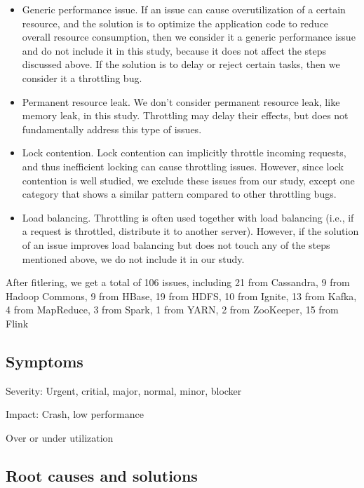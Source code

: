 \begin{itemize}

\item Generic performance issue. If an issue can cause overutilization of a certain resource, and the solution is to
optimize the application code to reduce overall resource consumption, then we consider it a generic performance issue
and do not include it in this study, because it does not affect the steps discussed above. If the solution is to delay or
reject certain tasks, then we consider it a throttling bug.

\item Permanent resource leak. We don't consider permanent resource leak, like memory leak, in this study. Throttling
may delay their effects, but does not fundamentally address this type of issues.

\item Lock contention. Lock contention can implicitly throttle incoming requests, and thus inefficient locking can cause throttling
issues. However, since lock contention is well studied, we exclude these issues from our study, except one category that
shows a similar pattern compared to other throttling bugs.

\item Load balancing. Throttling is often used together with load balancing (i.e., if a request is throttled, distribute it to
another server). However, if the solution of an issue improves load balancing but does not touch any of the steps
mentioned above, we do not include it in our study.

\end{itemize}

After fitlering, we get a total of 106 issues, including 21 from Cassandra, 9 from Hadoop Commons, 9 from HBase, 19 from HDFS, 10 from Ignite, 13 from Kafka, 
4 from MapReduce, 3 from Spark, 1 from YARN, 2 from ZooKeeper, 15 from Flink

\subsection{Symptoms}

Severity: Urgent, critial, major, normal, minor, blocker

Impact: Crash, low performance

Over or under utilization

\subsection{Root causes and solutions}

